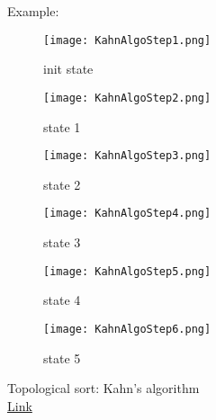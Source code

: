 \documentclass[12pt]{article}
\begin{document}
\pagebreak

Example:
\begin{figure}[H]
\centering
\texttt{[image: KahnAlgoStep1.png]}
\caption{init state}
\end{figure}

\begin{figure}[H]
\centering
\texttt{[image: KahnAlgoStep2.png]}
\caption{state 1}
\end{figure}

\begin{figure}[H]
\centering
\texttt{[image: KahnAlgoStep3.png]}
\caption{state 2}
\end{figure}

\begin{figure}[H]
\centering
\texttt{[image: KahnAlgoStep4.png]}
\caption{state 3}
\end{figure}
    
    
    \begin{figure}[H]
\centering
\texttt{[image: KahnAlgoStep5.png]}
\caption{state 4 }
\end{figure}

\begin{figure}[H]
\centering
\texttt{[image: KahnAlgoStep6.png]}
\caption{state 5}
\end{figure}

\begin{thebibliography}{1}
Topological sort: Kahn's algorithm \\ 
\href{https://en.wikipedia.org/wiki/Topological\_sorting\#Kahn's\_algorithm}{Link}
\end{thebibliography}
\end{document}
